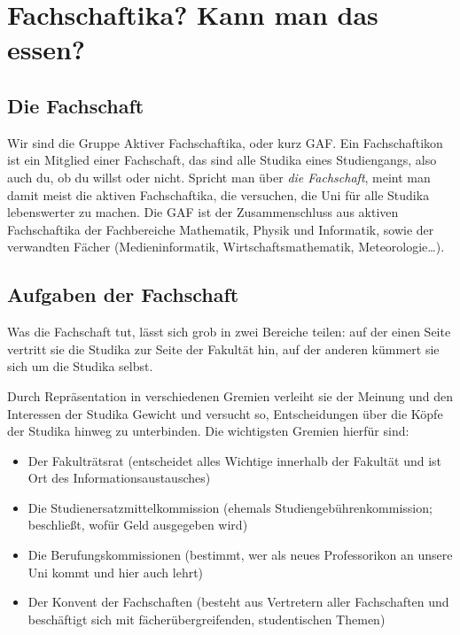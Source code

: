 \chapter{Fachschaftika? Kann man das essen?}

\section{Die Fachschaft}
Wir sind die Gruppe Aktiver Fachschaftika, oder kurz GAF. Ein Fachschaftikon ist ein Mitglied einer Fachschaft, das sind alle Studika eines Studiengangs, also auch du, ob du willst oder nicht. Spricht man über \emph{die Fachschaft}, meint man damit meist die aktiven Fachschaftika, die versuchen, die Uni für alle Studika lebenswerter zu machen. Die GAF ist der Zusammenschluss aus aktiven Fachschaftika der Fachbereiche Mathematik, Physik und Informatik, sowie der verwandten Fächer (Medieninformatik, Wirtschaftsmathematik, Meteorologie\ldots).

\section{Aufgaben der Fachschaft}

Was die Fachschaft tut, lässt sich grob in zwei Bereiche teilen: auf der einen Seite vertritt sie die Studika zur Seite der Fakultät hin, auf der anderen kümmert sie sich um die Studika selbst.

Durch Repräsentation in verschiedenen Gremien verleiht sie der Meinung und den Interessen der Studika Gewicht und versucht so, Entscheidungen über die Köpfe der Studika hinweg zu unterbinden. Die wichtigsten Gremien hierfür sind:
\begin{itemize}
\item Der Fakulträtsrat (entscheidet alles Wichtige innerhalb der Fakultät und ist Ort des Informationsaustausches)
\item Die Studienersatzmittelkommission (ehemals Studiengebührenkommission; beschließt, wofür Geld ausgegeben wird)
\item Die Berufungskommissionen (bestimmt, wer als neues Professorikon an unsere Uni kommt und hier auch lehrt)
\item Der Konvent der Fachschaften (besteht aus Vertretern aller Fachschaften und beschäftigt sich mit fächerübergreifenden, studentischen Themen)
\end{itemize}

